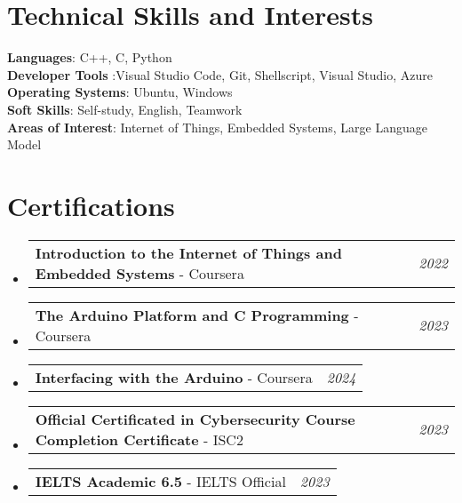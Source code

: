 \documentclass[a4paper,11pt]{article}
\makeatletter
\newcommand{\resumePOR}[3]{
\vspace{0.5mm}\item
    \begin{tabular*}{0.97\textwidth}[t]{l@{\extracolsep{\fill}}r}
        \textbf{#1}\hspace{0.3mm}#2 & \textit{\small{#3}} 
    \end{tabular*}
    \vspace{-2mm}
}
\newcommand{\resumeSubHeadingListStart}{\begin{itemize}[leftmargin=*,labelsep=0mm]}
\newcommand{\resumeSubHeadingListEnd}{\end{itemize}\vspace{2mm}}
\makeatother
\begin{document}
\section{\textbf{Technical Skills and Interests}}
\begin{itemize}[leftmargin=0.05in, label={}]
  \small{\item{
                \textbf{Languages}{: C++, C, Python} \\
                \textbf{Developer Tools} {:Visual Studio Code, Git, Shellscript, Visual Studio, Azure} \\
                \textbf{Operating Systems}{: Ubuntu, Windows} \\
                \textbf{Soft Skills}{: Self-study, English, Teamwork} \\
                \textbf{Areas of Interest}{: Internet of Things, Embedded Systems, Large Language Model} \\
          }}
\end{itemize}
\vspace{-16pt}


\section{\textbf{Certifications}}
\vspace{-0.4mm}
\resumeSubHeadingListStart
\resumePOR{Introduction to the Internet of Things and Embedded Systems} %
{ - Coursera} %
{2022} %

\resumePOR{The Arduino Platform and C Programming} %
{ - Coursera} %
{2023} %

\resumePOR{Interfacing with the Arduino} %
{ - Coursera} %
{2024} %

\resumePOR{Official Certificated in Cybersecurity Course Completion Certificate} %
{ - ISC2} %
{2023} %

\resumePOR{IELTS Academic 6.5} %
{ - IELTS Official} %
{2023} %

\resumeSubHeadingListEnd

\vspace{-5mm}

\end{document}
